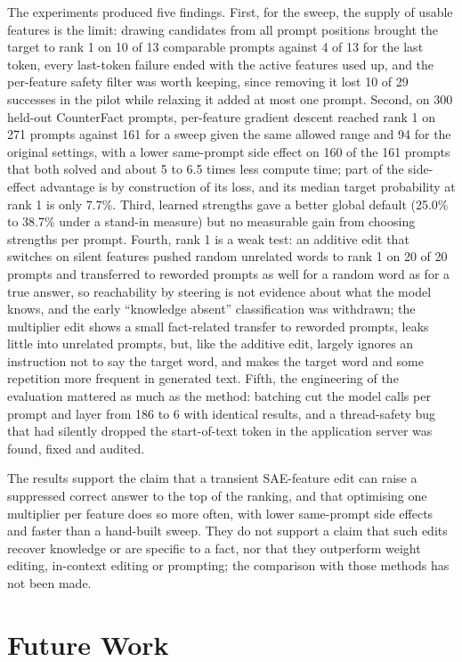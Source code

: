 \documentclass[12pt,a4paper]{report}
\begin{document}
The experiments produced five findings. First, for the sweep, the supply of usable features is the limit: drawing candidates from all prompt positions brought the target to rank 1 on 10 of 13 comparable prompts against 4 of 13 for the last token, every last-token failure ended with the active features used up, and the per-feature safety filter was worth keeping, since removing it lost 10 of 29 successes in the pilot while relaxing it added at most one prompt. Second, on 300 held-out CounterFact prompts, per-feature gradient descent reached rank 1 on 271 prompts against 161 for a sweep given the same allowed range and 94 for the original settings, with a lower same-prompt side effect on 160 of the 161 prompts that both solved and about 5 to 6.5 times less compute time; part of the side-effect advantage is by construction of its loss, and its median target probability at rank 1 is only 7.7\%. Third, learned strengths gave a better global default (25.0\% to 38.7\% under a stand-in measure) but no measurable gain from choosing strengths per prompt. Fourth, rank 1 is a weak test: an additive edit that switches on silent features pushed random unrelated words to rank 1 on 20 of 20 prompts and transferred to reworded prompts as well for a random word as for a true answer, so reachability by steering is not evidence about what the model knows, and the early ``knowledge absent'' classification was withdrawn; the multiplier edit shows a small fact-related transfer to reworded prompts, leaks little into unrelated prompts, but, like the additive edit, largely ignores an instruction not to say the target word, and makes the target word and some repetition more frequent in generated text. Fifth, the engineering of the evaluation mattered as much as the method: batching cut the model calls per prompt and layer from 186 to 6 with identical results, and a thread-safety bug that had silently dropped the start-of-text token in the application server was found, fixed and audited.

The results support the claim that a transient SAE-feature edit can raise a suppressed correct answer to the top of the ranking, and that optimising one multiplier per feature does so more often, with lower same-prompt side effects and faster than a hand-built sweep. They do not support a claim that such edits recover knowledge or are specific to a fact, nor that they outperform weight editing, in-context editing or prompting; the comparison with those methods has not been made.

\section{Future Work}
\end{document}
